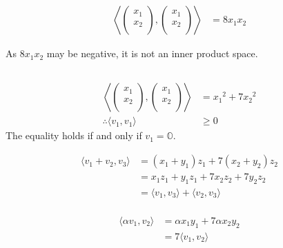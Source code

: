 \documentclass[fleqn, a4paper, draft]{amsart}
\theoremstyle{definition}
\theoremstyle{theorem}
\theoremstyle{remark}
\numberwithin{corollary}{theorem}
\numberwithin{equation}{theorem}
\begin{document}
\subsection{}

\begin{align*}
	\left\langle
		\begin{pmatrix}
			x_1\\
			x_2\\
		\end{pmatrix}
		,
		\begin{pmatrix}
			x_1\\
			x_2\\
		\end{pmatrix}
	\right\rangle
	&= 8 x_1 x_2
\end{align*}

As $8 x_1 x_2$ may be negative, it is not an inner product space.

\subsection{}

\begin{align*}
	\left\langle
		\begin{pmatrix}
			x_1\\
			x_2\\
		\end{pmatrix}
		,
		\begin{pmatrix}
			x_1\\
			x_2\\
		\end{pmatrix}
	\right\rangle
	&= {x_1}^2 + 7 {x_2}^2\\
	\therefore \langle v_1, v_1 \rangle &\geq 0
\end{align*}
The equality holds if and only if $v_1 = \mathbb{O}$.

\begin{align*}
	\langle v_1 + v_2, v_3 \rangle &= (x_1 + y_1) z_1 + 7 (x_2 + y_2) z_2\\
	&= x_1 z_1 + y_1 z_1 + 7 x_2 z_2 + 7 y_2 z_2\\
	&= \langle v_1, v_3 \rangle + \langle v_2, v_3 \rangle\\
\end{align*}

\begin{align*}
	\langle \alpha v_1, v_2 \rangle &= \alpha x_1 y_1 + 7 \alpha x_2 y_2\\
	&= 7 \langle v_1, v_2 \rangle
\end{align*}
\end{document}
